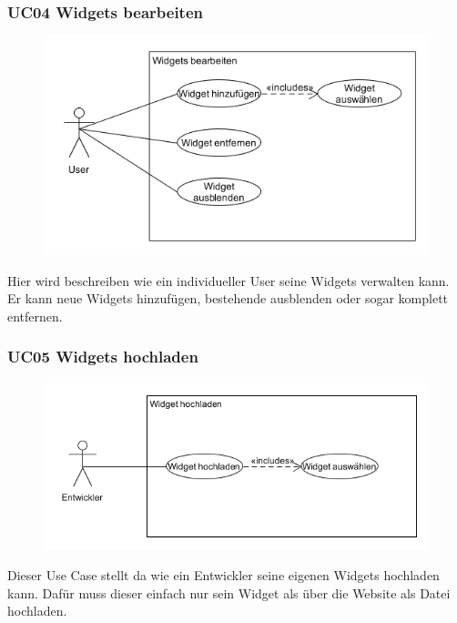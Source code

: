 		\subsubsection{UC04 Widgets bearbeiten}
			\begin{figure}[H]
				\includegraphics[scale=0.8]{images/WidgetsBearbeiten}
			\end{figure}
			Hier wird beschreiben wie ein individueller User seine Widgets verwalten kann. Er kann neue Widgets hinzufügen, bestehende ausblenden oder sogar komplett entfernen. 
			
		
		\subsubsection{UC05 Widgets hochladen}
			\begin{figure}[H]
				\includegraphics[scale=0.8]{images/WidgetHochladen}
			\end{figure}
			Dieser Use Case stellt da wie ein Entwickler seine eigenen Widgets hochladen kann. Dafür muss dieser einfach nur sein Widget als über die Website als Datei hochladen. 
	
